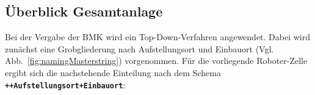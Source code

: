 
\subsection*{Überblick Gesamtanlage}
\label{subsec:namingOverview}


Bei der Vergabe der BMK wird ein Top-Down-Verfahren angewendet. Dabei wird zunächst eine Grobgliederung nach Aufstellungsort und Einbauort (Vgl. Abb.~\ref{fig:namingMasterstring}) vorgenommen. Für die vorliegende Roboter-Zelle ergibt sich die nachstehende Einteilung nach dem Schema \textbf{\texttt{++Aufstellungsort+Einbauort}}:

